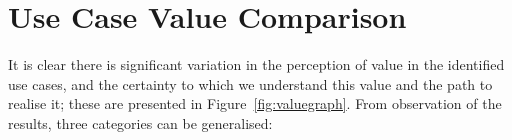 \documentclass[b5paper,10pt]{article}
\begin{document}

\section{Use Case Value Comparison}\label{usecasecomp}


It is clear there is significant variation in the perception of value
in the identified use cases, and the certainty to which we understand
this value and the path to realise it; these are presented in
Figure~\ref{fig:valuegraph}. From observation of the results, three
categories can be generalised:
\end{document}
